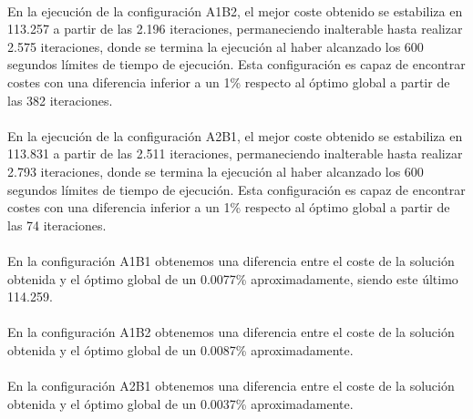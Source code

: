 	\paragraph{}En la ejecución de la configuración A1B2, el mejor coste obtenido se estabiliza en 113.257 a partir de las 2.196 iteraciones, permaneciendo inalterable hasta realizar 2.575 iteraciones, donde se termina la ejecución al haber alcanzado los 600 segundos límites de tiempo de ejecución. Esta configuración es capaz de encontrar costes con una diferencia inferior a un 1\% respecto al óptimo global a partir de las 382 iteraciones.
	
	\paragraph{}En la ejecución de la configuración A2B1, el mejor coste obtenido se estabiliza en 113.831 a partir de las 2.511 iteraciones, permaneciendo inalterable hasta realizar 2.793 iteraciones, donde se termina la ejecución al haber alcanzado los 600 segundos límites de tiempo de ejecución. Esta configuración es capaz de encontrar costes con una diferencia inferior a un 1\% respecto al óptimo global a partir de las 74 iteraciones.
	
	\paragraph{}En la configuración A1B1 obtenemos una diferencia entre el coste de la solución obtenida y el óptimo global de un 0.0077\% aproximadamente, siendo este último 114.259.
	
	\paragraph{}En la configuración A1B2 obtenemos una diferencia entre el coste de la solución obtenida y el óptimo global de un 0.0087\% aproximadamente.
	
	\paragraph{}En la configuración A2B1 obtenemos una diferencia entre el coste de la solución obtenida y el óptimo global de un 0.0037\% aproximadamente.

